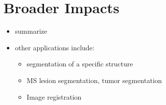 \section{Broader Impacts}

\begin{itemize}
\item summarize
\item other applications include:
\begin{itemize}
\item segmentation of a specific structure
\item MS lesion segmentation, tumor segmentation
\item Image registration
\end{itemize}
\end{itemize}
